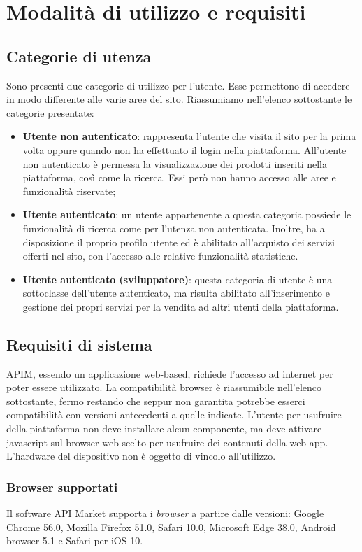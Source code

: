 \newpage
\section{Modalità di utilizzo e requisiti}

\subsection{Categorie di utenza}
Sono presenti due categorie di utilizzo per l'utente. Esse permettono di accedere in modo differente alle varie aree del sito. Riassumiamo nell'elenco sottostante le categorie presentate:

\begin{itemize}
	\item \textbf{Utente non autenticato}: rappresenta l'utente che visita il sito per la prima volta oppure quando non ha effettuato il login nella piattaforma. All'utente non autenticato è permessa la visualizzazione dei prodotti inseriti nella piattaforma, così come la ricerca. Essi però non hanno accesso alle aree e funzionalità riservate;
	\item \textbf{Utente autenticato}: un utente appartenente a questa categoria possiede le funzionalità di ricerca come per l'utenza non autenticata. Inoltre, ha a disposizione il proprio profilo utente ed è abilitato all'acquisto dei servizi offerti nel sito, con l'accesso alle relative funzionalità statistiche.
	\item \textbf{Utente autenticato (sviluppatore)}: questa categoria di utente è una sottoclasse dell'utente autenticato, ma risulta abilitato all'inserimento e gestione dei propri servizi per la vendita ad altri utenti della piattaforma. 
\end{itemize}

\subsection{Requisiti di sistema}
APIM, essendo un applicazione web-based, richiede l'accesso ad internet per poter essere utilizzato. La compatibilità browser è riassumibile nell'elenco sottostante, fermo restando che seppur non garantita potrebbe esserci compatibilità con versioni antecedenti a quelle indicate. L'utente per usufruire della piattaforma non deve installare alcun componente, ma deve attivare javascript sul browser web scelto per usufruire dei contenuti della web app.
L'hardware del dispositivo non è oggetto di vincolo all'utilizzo.

\subsubsection{Browser supportati}
Il software API Market supporta i \textit{browser} a partire dalle versioni: Google Chrome 56.0, Mozilla Firefox 51.0, Safari 10.0, Microsoft Edge 38.0, Android browser 5.1 e Safari per iOS 10.